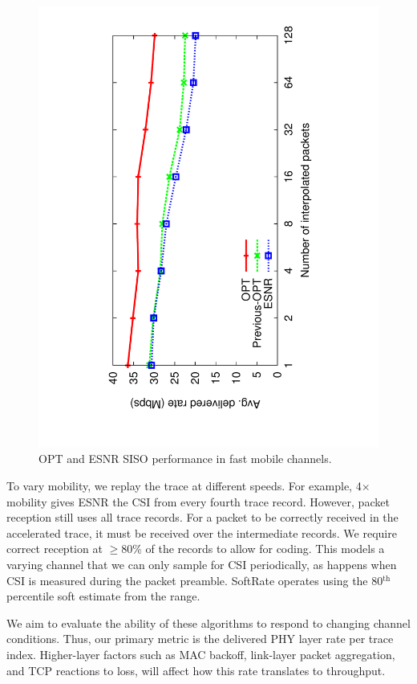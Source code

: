 \begin{figure}[t]
      \centering
      \includegraphics[angle=-90,viewport=120 68 491 760,clip,width=0.95\columnwidth]{figures/siso_rate_skip_opt_eff.pdf}
      \caption{\label{fig:siso_rate_skip_opt_eff} OPT and ESNR SISO performance in fast mobile channels.}
\end{figure}


To vary mobility, we replay the trace at different speeds. For example, 4$\times$ mobility gives ESNR the CSI from every fourth trace record. However, packet reception still uses all trace records. For a packet to be correctly received in the accelerated trace, it must be received over the intermediate records. We require correct reception at $\geq$80\% of the records to allow for coding. This models a varying channel that we can only sample for CSI periodically, as happens when CSI is measured during the packet preamble. SoftRate operates using the 80$^\text{th}$ percentile soft estimate from the range.

We aim to evaluate the ability of these algorithms to respond to changing channel conditions. Thus, our primary metric is the delivered PHY layer rate per trace index. Higher-layer factors such as MAC backoff, link-layer packet aggregation, and TCP reactions to loss, will affect how this rate translates to throughput.

